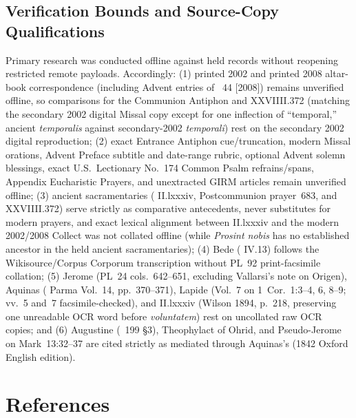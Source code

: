 \subsection{Verification Bounds and Source-Copy Qualifications}
Primary research was conducted offline against held records without reopening restricted remote payloads. Accordingly: (1) printed 2002 and printed 2008  altar-book correspondence (including Advent entries of ~44 [2008]) remains unverified offline, so comparisons for the Communion Antiphon and  XXVIIII.372 (matching the secondary 2002 digital Missal copy except for one inflection of ``temporal,'' ancient \emph{temporalis} against secondary-2002 \emph{temporali}) rest on the secondary 2002 digital reproduction; (2) exact Entrance Antiphon cue/truncation, modern Missal orations, Advent Preface subtitle and date-range rubric, optional Advent solemn blessings, exact U.S.\ Lectionary No.~174 Common Psalm refrains/spans, Appendix Eucharistic Prayers, and unextracted GIRM articles remain unverified offline; (3) ancient sacramentaries ( II.lxxxiv, Postcommunion prayer~683, and  XXVIIII.372) serve strictly as comparative antecedents, never substitutes for modern prayers, and exact lexical alignment between  II.lxxxiv and the modern 2002/2008 Collect was not collated offline (while \emph{Prosint nobis} has no established ancestor in the held ancient sacramentaries); (4) Bede ( IV.13) follows the Wikisource/Corpus Corporum transcription without PL~92 print-facsimile collation; (5) Jerome (PL~24 cols.~642--651, excluding Vallarsi's note on Origen), Aquinas ( Parma Vol.~14, pp.~370--371), Lapide (Vol.~7 on 1~Cor.~1:3--4, 6, 8--9; vv.~5 and~7 facsimile-checked), and  II.lxxxiv (Wilson 1894, p.~218, preserving one unreadable OCR word before \emph{voluntatem}) rest on uncollated raw OCR copies; and (6) Augustine (~199 §3), Theophylact of Ohrid, and Pseudo-Jerome on Mark~13:32--37 are cited strictly as mediated through Aquinas's  (1842 Oxford English edition).

\section*{References}

